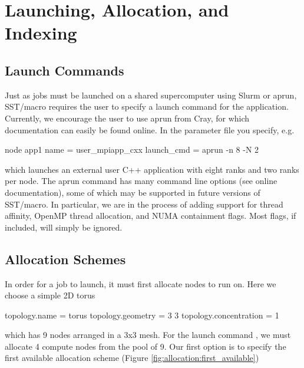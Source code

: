 
\section{Launching, Allocation, and Indexing}
\label{sec:tutorial:launchetc}

\subsection{Launch Commands}
\label{subsec:tutorial:launch}
Just as jobs must be launched on a shared supercomputer using Slurm or aprun, 
SST/macro requires the user to specify a launch command for the application.
Currently, we encourage the user to use aprun from Cray, for which documentation can easily be found online.
In the parameter file you specify, e.g.

\begin{ViFile}
node {
 app1 {
  name = user_mpiapp_cxx
  launch_cmd = aprun -n 8 -N 2
 }
}

\end{ViFile}
which launches an external user C++ application with eight ranks and two ranks per node.
The aprun command has many command line options (see online documentation), some of which may be supported in future versions of SST/macro.  In particular, we are in the process of adding support for thread affinity, OpenMP thread allocation, and NUMA containment flags.  Most flags, if included, will simply be ignored.

\subsection{Allocation Schemes}
\label{subsec:tutorial:allocation}
In order for a job to launch, it must first allocate nodes to run on. Here we choose a simple 2D torus

\begin{ViFile}
topology.name = torus
topology.geometry = 3 3
topology.concentration = 1
\end{ViFile}
which has 9 nodes arranged in a 3x3 mesh.  
For the launch command , we must allocate 4 compute nodes from the pool of 9.
Our first option is to specify the first available allocation scheme (Figure \ref{fig:allocation:first_available})

